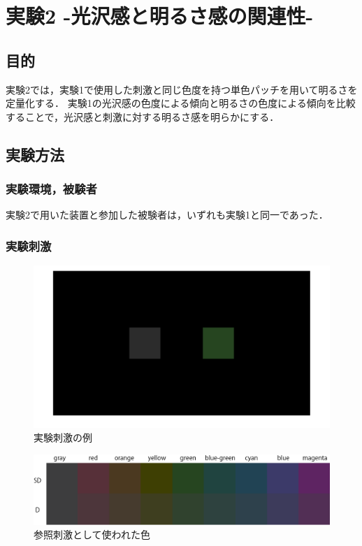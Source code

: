 \chapter{実験2 -光沢感と明るさ感の関連性-}

    \section{目的}

        実験2では，実験1で使用した刺激と同じ色度を持つ単色パッチを用いて明るさを定量化する．
        実験1の光沢感の色度による傾向と明るさの色度による傾向を比較することで，光沢感と刺激に対する明るさ感を明らかにする．


    \section{実験方法}
        \subsection{実験環境，被験者}

            実験2で用いた装置と参加した被験者は，いずれも実験1と同一であった．

        \subsection{実験刺激}

            \begin{figure}[h]
                \centering
                \includegraphics[width=14.0cm]{./img/ex2_stimuli2.png}
                \caption{実験刺激の例}
                \label{ex2_stimuli}
            \end{figure}

            \begin{figure}[h]
                \centering
                \includegraphics[width=14.0cm]{./img/ex2_stimuli_p.png}
                \caption{参照刺激として使われた色}
                \label{ex2_stimuli_set}
            \end{figure}
            \newpage

